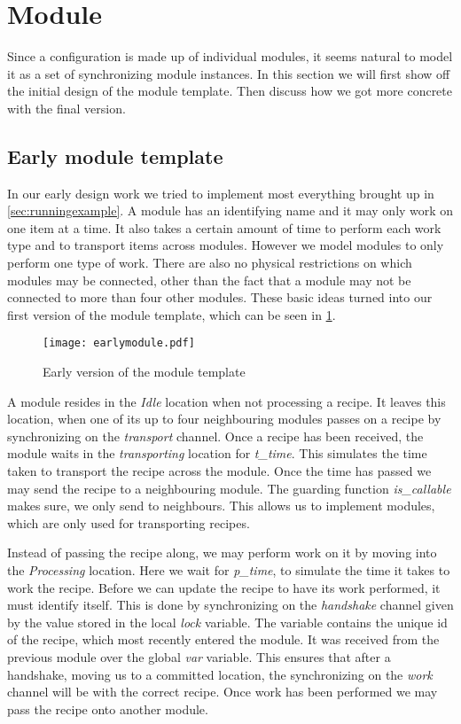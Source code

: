 \section{Module}
\label{subs:module}
Since a configuration is made up of individual modules, it seems natural to model it as a set of synchronizing module instances. In this section we will first show off the initial design of the module template. Then discuss how we got more concrete with the final version. 

\subsection{Early module template}
In our early design work we tried to implement most everything brought up in \cref{sec:runningexample}. A module has an identifying name and it may only work on one item at a time. It also takes a certain amount of time to perform each work type and to transport items across modules. However we model modules to only perform one type of work. There are also no physical restrictions on which modules may be connected, other than the fact that a module may not be connected to more than four other modules. These basic ideas turned into our first version of the module template, which can be seen in \cref{fig:earlymodule}.


\begin{figure}[h]
\centering
\texttt{[image: earlymodule.pdf]}
\caption{Early version of the module template}
\label{fig:earlymodule}
\end{figure}

A module resides in the \emph{Idle} location when not processing a recipe. It leaves this location, when one of its up to four neighbouring modules passes on a recipe by synchronizing on the \emph{transport} channel. Once a recipe has been received, the module waits in the \emph{transporting} location for \emph{t\_time}. This simulates the time taken to transport the recipe across the module. Once the time has passed we may send the recipe to a neighbouring module. The guarding function \emph{is\_callable} makes sure, we only send to neighbours. This allows us to implement modules, which are only used for transporting recipes.

Instead of passing the recipe along, we may perform work on it by moving into the \emph{Processing} location. Here we wait for \emph{p\_time}, to simulate the time it takes to work the recipe. Before we can update the recipe to have its work performed, it must identify itself. This is done by synchronizing on the \emph{handshake} channel given by the value stored in the local \emph{lock} variable. The variable contains the unique id of the recipe, which most recently entered the module. It was received from the previous module over the global \emph{var} variable. This ensures that after a handshake, moving us to a committed location, the synchronizing on the \emph{work} channel will be with the correct recipe. Once work has been performed we may pass the recipe onto another module. 

